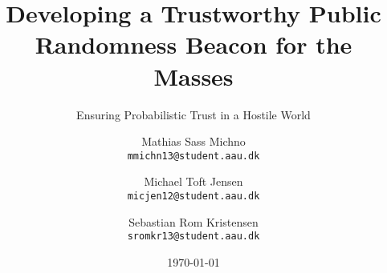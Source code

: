\newcommand{\TITLE}{Developing a Trustworthy Public Randomness Beacon for the Masses}
\newcommand{\SUBTITLE}{Ensuring Probabilistic Trust in a Hostile World}
\newcommand{\GROUP}{deis1014f18}
\newcommand{\PERIOD}{Spring semester, 2018}
\newcommand{\MEMBERS}{%
    Mathias Sass Michno\\
    Michael Toft Jensen\\
    Sebastian Rom Kristensen
}
\newcommand{\SUPERVISOR}{René Rydhof Hansen\\Stefan Schmid}
\newcommand{\COMPLETION}{June 8, 2018}

\title{\TITLE}
\subtitle{\SUBTITLE}
\author{
    Mathias Sass Michno\\
    \texttt{mmichn13@student.aau.dk}
    \and
    Michael Toft Jensen\\
    \texttt{micjen12@student.aau.dk}
    \and
    Sebastian Rom Kristensen\\
    \texttt{sromkr13@student.aau.dk}
}
\date{\today}
